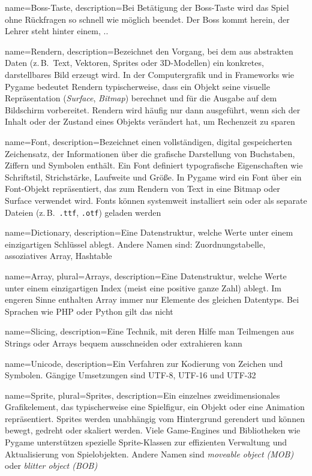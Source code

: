 {
	name={Boss-Taste},
	description={Bei Betätigung der Boss-Taste wird das Spiel ohne Rückfragen so schnell wie möglich beendet. Der Boss kommt herein, der Lehrer steht hinter einem, ..} 
}

{
	name={Rendern},
	description={Bezeichnet den Vorgang, bei dem aus abstrakten Daten (z.\,B.\ Text, Vektoren, Sprites oder 3D-Modellen) ein konkretes, darstellbares Bild erzeugt wird. In der Computergrafik und in 
		Frameworks wie Pygame bedeutet Rendern typischerweise, dass ein Objekt seine visuelle Repräsentation (\emph{Surface}, \emph{Bitmap}) berechnet und für die Ausgabe auf dem Bildschirm vorbereitet. Rendern wird häufig nur dann ausgeführt, wenn sich der Inhalt oder der Zustand eines Objekts verändert hat, um Rechenzeit zu sparen} 
}

{
	name={Font},
	description={Bezeichnet einen vollständigen, digital gespeicherten Zeichensatz, der Informationen über die grafische Darstellung von 	Buchstaben, Ziffern und Symbolen enthält. Ein Font definiert 	typografische Eigenschaften wie Schriftstil, Strichstärke, Laufweite und Größe. In Pygame wird ein Font über ein Font-Objekt repräsentiert, das zum Rendern von Text in eine Bitmap oder Surface verwendet wird. Fonts können systemweit installiert sein oder als separate Dateien (z.\,B.\ \texttt{.ttf}, \texttt{.otf}) geladen werden} 
}

{
	name={Dictionary},
	description={Eine Datenstruktur, welche Werte unter einem einzigartigen Schlüssel ablegt. Andere Namen sind: Zuordnungstabelle, assoziatives Array, Hashtable} 
}

{
	name={Array},
    plural={Arrays},
	description={Eine Datenstruktur, welche Werte unter einem einzigartigen Index (meist eine positive ganze Zahl) ablegt. Im engeren Sinne enthalten Array immer nur Elemente des gleichen Datentyps. Bei Sprachen wie PHP oder Python gilt das nicht} 
}

{
	name={Slicing},
	description={Eine Technik, mit deren Hilfe man Teilmengen aus Strings oder Arrays bequem ausschneiden oder extrahieren kann} 
}

{
	name={Unicode},
	description={Ein Verfahren zur Kodierung von Zeichen und Symbolen. Gängige Umsetzungen sind UTF-8, UTF-16 und UTF-32} 
}

{
	name={Sprite},
    plural={Sprites},
	description={Ein einzelnes zweidimensionales Grafikelement, das typischerweise eine Spielfigur, ein Objekt oder eine Animation repräsentiert. Sprites werden unabhängig vom Hintergrund gerendert und können bewegt, gedreht oder skaliert werden. Viele Game-Engines und Bibliotheken wie Pygame unterstützen spezielle Sprite-Klassen zur effizienten Verwaltung und Aktualisierung von Spielobjekten. Andere Namen sind \emph{moveable object (MOB)} oder \emph{blitter object (BOB)} } 
}

